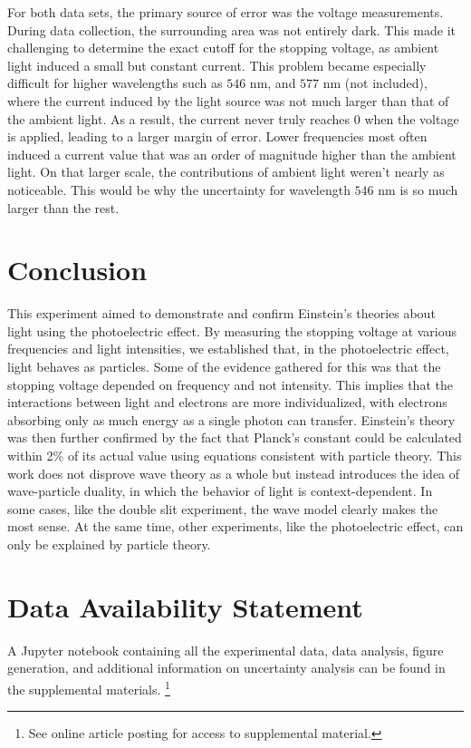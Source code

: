 \documentclass[rc,ec]{physicsinprogress}
\begin{document}
For both data sets, the primary source of error was the voltage measurements. During data collection, the surrounding area was not entirely dark. This made it challenging to determine the exact cutoff for the stopping voltage, as ambient light induced a small but constant current. This problem became especially difficult for higher wavelengths such as $546 $ nm, and $577 $ nm (not included), where the current induced by the light source was not much larger than that of the ambient light. As a result, the current never truly reaches $0$ when the voltage is applied, leading to a larger margin of error. Lower frequencies most often induced a current value that was an order of magnitude higher than the ambient light. On that larger scale, the contributions of ambient light weren't nearly as noticeable. This would be why the uncertainty for wavelength $546 $ nm is so much larger than the rest.

\section{Conclusion}

This experiment aimed to demonstrate and confirm Einstein's theories about light using the photoelectric effect. By measuring the stopping voltage at various frequencies and light intensities, we established that, in the photoelectric effect, light behaves as particles. Some of the evidence gathered for this was that the stopping voltage depended on frequency and not intensity. This implies that the interactions between light and electrons are more individualized, with electrons absorbing only as much energy as a single photon can transfer. Einstein's theory was then further confirmed by the fact that Planck's constant could be calculated within 2\% of its actual value using equations consistent with particle theory. This work does not disprove wave theory as a whole but instead introduces the idea of wave-particle duality, in which the behavior of light is context-dependent. In some cases, like the double slit experiment, the wave model clearly makes the most sense. At the same time, other experiments, like the photoelectric effect, can only be explained by particle theory. 

\section*{Data Availability Statement}
A Jupyter notebook containing all the experimental data, data analysis, figure generation, and additional information on uncertainty analysis can be found in the supplemental materials. \footnote{See online article posting for access to supplemental material.}

\end{document}
